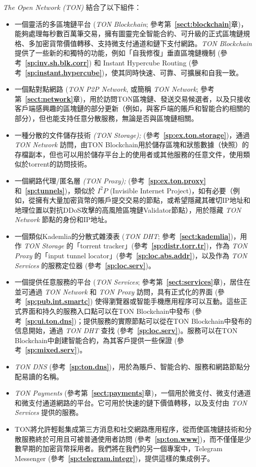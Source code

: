 \documentclass[12pt,oneside]{article}
\def\refpoint#1{{\rm\textbf{\ref{#1}}}}
\let\ptref=\refpoint
\begin{document}
{\em The Open Network (TON)} 結合了以下組件：
\begin{itemize}
\item 一個靈活的多區塊鏈平台 ({\em TON Blockchain}; 參考第~\ptref{sect:blockchain}章)，能夠處理每秒數百萬筆交易，擁有圖靈完全智能合約、可升級的正式區塊鏈規格、多加密貨幣價值轉移、支持微支付通道和鏈下支付網路。{\em TON Blockchain\/} 提供了一些新的和獨特的功能，例如「自我修復」垂直區塊鏈機制 (參考~\ptref{sp:inv.sh.blk.corr}) 和 Instant Hypercube Routing (參考~\ptref{sp:instant.hypercube})，使其同時快速、可靠、可擴展和自我一致。
\item 一個點對點網路 ({\em TON P2P Network}, 或簡稱 {\em TON Network}; 參考第~\ptref{sect:network}章)，用於訪問TON區塊鏈、發送交易候選者，以及只接收客戶端感興趣的區塊鏈的部分更新（例如，與客戶端的賬戶和智能合約相關的部分），但也能支持任意分散服務，無論是否與區塊鏈相關。
\item 一種分散的文件儲存技術 {\em (TON Storage);} (參考~\ptref{sp:ex.ton.storage})，通過 {\em TON Network} 訪問，由TON Blockchain用於儲存區塊和狀態數據（快照）的存檔副本，但也可以用於儲存平台上的使用者或其他服務的任意文件，使用類似於torrent的訪問技術。
\item 一個網路代理/匿名層 {\em (TON Proxy);} (參考~\ptref{sp:ex.ton.proxy} 和~\ptref{sp:tunnels})，類似於 $I^2P$ (Invisible Internet Project)，如有必要（例如，從擁有大量加密貨幣的賬戶提交交易的節點，或希望隱藏其確切IP地址和地理位置以對抗DDoS攻擊的高風險區塊鏈Validator節點），用於隱藏 {\em TON Network\/} 節點的身份和IP地址。
\item 一個類似Kademlia的分散式雜湊表 ({\em TON DHT}; 參考~\ptref{sect:kademlia})，用作 {\em TON Storage} 的「torrent tracker」(參考~\ptref{sp:distr.torr.tr})，作為 {\em TON Proxy\/} 的「input tunnel locator」(參考~\ptref{sp:loc.abs.addr})，以及作為 {\em TON Services} 的服務定位器 (參考~\ptref{sp:loc.serv})。
\item 一個提供任意服務的平台 ({\em TON Services}; 參考第~\ptref{sect:services}章)，居住在並可通過 {\em TON Network\/} 和 {\em TON Proxy} 訪問，具有正式化的界面 (參考~\ptref{sp:pub.int.smartc}) 使得瀏覽器或智能手機應用程序可以互動。這些正式界面和持久的服務入口點可以在TON Blockchain中發布 (參考~\ptref{sp:ui.ton.dns})；提供服務的實際節點可以從在TON Blockchain中發布的信息開始，通過 {\em TON DHT\/} 查找 (參考~\ptref{sp:loc.serv})。服務可以在TON Blockchain中創建智能合約，為其客戶提供一些保證 (參考~\ptref{sp:mixed.serv})。
\item {\em TON DNS\/} (參考~\ptref{sp:ton.dns})，用於為賬戶、智能合約、服務和網路節點分配易讀的名稱。
\item {\em TON Payments\/} (參考第~\ptref{sect:payments}章)，一個用於微支付、微支付通道和微支付通道網路的平台。它可用於快速的鏈下價值轉移，以及支付由 {\em TON Services} 提供的服務。
\item TON將允許輕鬆集成第三方消息和社交網路應用程序，從而使區塊鏈技術和分散服務終於可用且可被普通使用者訪問 (參考~\ptref{sp:ton.www})，而不僅僅是少數早期的加密貨幣採用者。我們將在我們的另一個專案中，Telegram Messenger (參考~\ptref{sp:telegram.integr})，提供這樣的集成例子。
\end{itemize}
\end{document}
